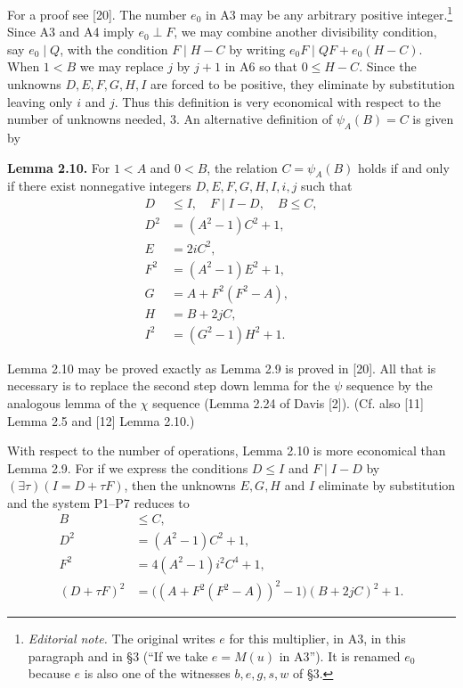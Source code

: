 \documentclass[11pt,a4paper]{article}
\newcommand{\origpage}[1]{\marginnote{\footnotesize\textbf{[#1]}}}
\newcommand{\ednote}[1]{\footnote{\textit{Editorial note.} #1}}
\begin{document}
For a proof see [20]. The number $e_0$ in A3 may be any arbitrary positive integer.\ednote{The original writes $e$ for this multiplier, in A3, in this paragraph and in \S3 (``If we take $e=M(u)$ in A3''). It is renamed $e_0$ because $e$ is also one of the witnesses $b,e,g,s,w$ of \S3.} Since A3 and A4 imply $e_0\perp F$, we may combine another divisibility condition, say $e_0\mid Q$, with the condition $F \mid H-C$ by writing $e_0F\mid QF+e_0(H-C)$. When $1<B$ we may replace $j$ by $j+1$ in A6 so that $0 \leq H-C$. Since the unknowns $D, E, F, G, H, I$ are forced to be positive, they eliminate by substitution leaving only $i$ and $j$. Thus this definition is very economical with \origpage{345}respect to the number of unknowns needed, 3. An alternative definition of $\psi_{A}(B)=C$ is given by

\par{}\medskip\noindent\textbf{Lemma 2.10.} For $1<A$ and $0<B$, the relation $C=\psi_{A}(B)$ holds if and only if there exist nonnegative integers $D, E, F, G, H, I, i, j$ such that
\begin{align*}
D&\leq I,\quad F\mid I-D,\quad B\leq C, \tag{P1}\\
D^2&=(A^2-1)C^2+1, \tag{P2}\\
E&=2iC^2, \tag{P3}\\
F^2&=(A^2-1)E^2+1, \tag{P4}\\
G&=A+F^2(F^2-A), \tag{P5}\\
H&=B+2jC, \tag{P6}\\
I^2&=(G^2-1)H^2+1. \tag{P7}
\end{align*}

Lemma 2.10 may be proved exactly as Lemma 2.9 is proved in [20]. All that is necessary is to replace the second step down lemma for the $\psi$ sequence by the analogous lemma of the $\chi$ sequence (Lemma 2.24 of Davis [2]). (Cf. also [11] Lemma 2.5 and [12] Lemma 2.10.)

With respect to the number of operations, Lemma 2.10 is more economical than Lemma 2.9. For if we express the conditions $D \leq I$ and $F \mid I-D$ by $(\exists \tau)(I=D+\tau F)$, then the unknowns $E, G, H$ and $I$ eliminate by substitution and the system P1--P7 reduces to
\begin{align*}
B&\leq C, \tag{Q1}\\
D^2&=(A^2-1)C^2+1, \tag{Q2}\\
F^2&=4(A^2-1)i^2C^4+1, \tag{Q3}\\
(D+\tau F)^2&=\bigl((A+F^2(F^2-A))^2-1\bigr)(B+2jC)^2+1. \tag{Q4}
\end{align*}
\end{document}
